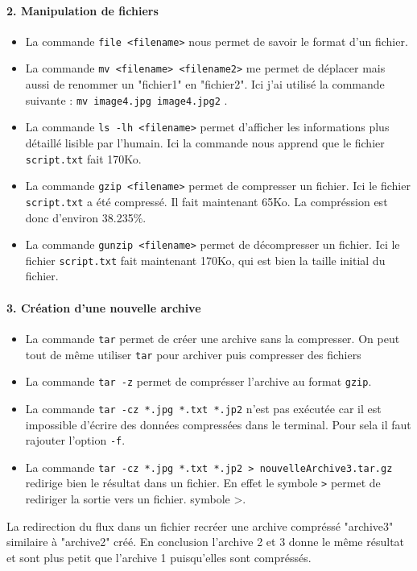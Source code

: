 \paragraph{2. Manipulation de fichiers}
\begin{itemize}
  \item La commande \texttt{file <filename>} nous permet de savoir le format d'un fichier.
  \item La commande \texttt{mv <filename> <filename2>} me permet de déplacer mais aussi de renommer un "fichier1" en "fichier2". Ici j'ai utilisé la commande suivante : \texttt{mv image4.jpg image4.jpg2} .
  \item La commande \texttt{ls -lh <filename>} permet d'afficher les informations plus détaillé lisible par l'humain. Ici la commande nous apprend que le fichier \texttt{script.txt} fait 170Ko.
  \item La commande \texttt{gzip <filename>} permet de compresser un fichier. Ici le fichier \texttt{script.txt} a été compressé. Il fait maintenant  65Ko. La compréssion est donc d'environ 38.235\%.
  \item La commande \texttt{gunzip <filename>} permet de décompresser un fichier. Ici le fichier \texttt{script.txt} fait maintenant 170Ko, qui est bien la taille initial du fichier.
\end{itemize}

\paragraph{3. Création d'une nouvelle archive}
\begin{itemize}
  \item La commande \texttt{tar} permet de créer une archive sans la compresser. On peut tout de même utiliser \texttt{tar} pour archiver puis compresser des fichiers
  \item La commande \texttt{tar -z} permet de comprésser l'archive au format \texttt{gzip}.
  \item La commande \texttt{tar -cz *.jpg *.txt *.jp2} n'est pas exécutée car il est impossible d’écrire des données compressées dans le terminal. Pour sela il faut rajouter l'option \texttt{-f}.
  \item La commande \texttt{tar -cz *.jpg *.txt *.jp2 > nouvelleArchive3.tar.gz} redirige bien le résultat dans un fichier. En effet le symbole \texttt{>} permet de rediriger la sortie vers un fichier.
symbole >.
\end{itemize}
La redirection du flux dans un fichier recréer une archive compréssé "archive3" similaire à "archive2"  créé.
En conclusion l'archive 2 et 3 donne le même résultat et sont plus petit que l'archive 1 puisqu'elles sont compréssés.

